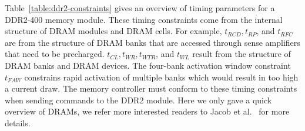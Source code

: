 Table~\ref{table:ddr2-constraints} gives an overview of timing parameters for a DDR2-400 memory module.
These timing constraints come from the internal structure of DRAM modules and DRAM cells.
For example, $t_{RCD}, t_{RP}$, and $t_{RFC}$ are from the structure of DRAM banks that are accessed through sense amplifiers that need to be precharged.
$t_{CL}, t_{WR}, t_{WTR}$, and $t_{WL}$ result from the structure of DRAM banks and DRAM devices.
The four-bank activation window constraint $t_{FAW}$ constrains rapid activation of multiple banks which would result in too high a current draw.
The memory controller must conform to these timing constraints when sending commands to the DDR2 module.  
Here we only gave a quick overview of DRAMs, we refer more interested readers to Jacob et al.~\cite{JaNgWa07} for more details.


